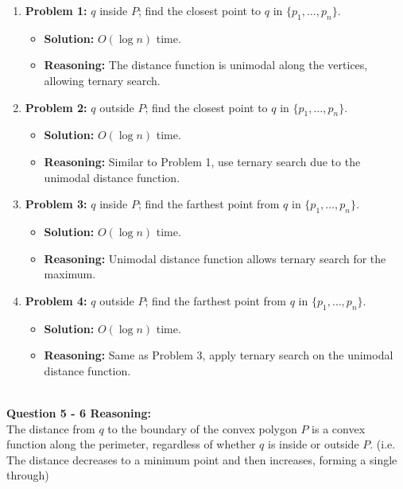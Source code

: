 \documentclass{article}
\begin{document}
\begin{enumerate}
    \item \textbf{Problem 1:} \( q \) inside \( P \); find the closest point to \( q \) in \( \{p_1, \dots, p_n\} \).
    \begin{itemize}
        \item \textbf{Solution:} \( O(\log n) \) time.
        \item \textbf{Reasoning:} The distance function is unimodal along the vertices, allowing ternary search.
    \end{itemize}

    \item \textbf{Problem 2:} \( q \) outside \( P \); find the closest point to \( q \) in \( \{p_1, \dots, p_n\} \).
    \begin{itemize}
        \item \textbf{Solution:} \( O(\log n) \) time.
        \item \textbf{Reasoning:} Similar to Problem 1, use ternary search due to the unimodal distance function.
    \end{itemize}

    \item \textbf{Problem 3:} \( q \) inside \( P \); find the farthest point from \( q \) in \( \{p_1, \dots, p_n\} \).
    \begin{itemize}
        \item \textbf{Solution:} \( O(\log n) \) time.
        \item \textbf{Reasoning:} Unimodal distance function allows ternary search for the maximum.
    \end{itemize}

    \item \textbf{Problem 4:} \( q \) outside \( P \); find the farthest point from \( q \) in \( \{p_1, \dots, p_n\} \).
    \begin{itemize}
        \item \textbf{Solution:} \( O(\log n) \) time.
        \item \textbf{Reasoning:} Same as Problem 3, apply ternary search on the unimodal distance function.
    \end{itemize}
\end{enumerate}
\\
\textbf{Question 5 - 6 Reasoning: }
\\
The distance from $q$ to the boundary of the convex polygon $P$ is a convex function along the perimeter, regardless of whether $q$ is inside or outside $P$.
(i.e. The distance decreases to a minimum point and then increases, forming a single through)
\end{document}

